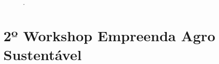 \begin{apendicesenv}
\begin{figure}[H]
\qquad
{}
.
\label{figura_29_1}
\end{figure}


\chapter{2º Workshop Empreenda Agro Sustentável}
\label{app:workshop_2}


\end{apendicesenv}
